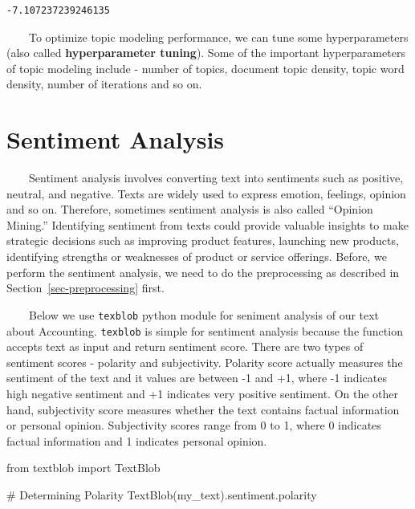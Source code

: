 \documentclass[
  letterpaper,
  DIV=11,
  numbers=noendperiod]{scrreprt}
\newenvironment{Shaded}{\begin{snugshade}}{\end{snugshade}}
\newcommand{\CommentTok}[1]{\textcolor[rgb]{0.37,0.37,0.37}{#1}}
\newcommand{\ImportTok}[1]{\textcolor[rgb]{0.00,0.46,0.62}{#1}}
\newcommand{\NormalTok}[1]{\textcolor[rgb]{0.00,0.23,0.31}{#1}}
\begin{document}
\begin{verbatim}
-7.107237239246135
\end{verbatim}

~~~~To optimize topic modeling performance, we can tune some
hyperparameters (also called \textbf{hyperparameter tuning}). Some of
the important hyperparameters of topic modeling include - number of
topics, document topic density, topic word density, number of iterations
and so on.

\section{Sentiment Analysis}\label{sentiment-analysis}

~~~~Sentiment analysis involves converting text into sentiments such as
positive, neutral, and negative. Texts are widely used to express
emotion, feelings, opinion and so on. Therefore, sometimes sentiment
analysis is also called ``Opinion Mining.'' Identifying sentiment from
texts could provide valuable insights to make strategic decisions such
as improving product features, launching new products, identifying
strengths or weaknesses of product or service offerings. Before, we
perform the sentiment analysis, we need to do the preprocessing as
described in Section~\ref{sec-preprocessing} first.

~~~~Below we use \texttt{texblob} python module for seniment analysis of
our text about Accounting. \texttt{texblob} is simple for sentiment
analysis because the function accepts text as input and return sentiment
score. There are two types of sentiment scores - polarity and
subjectivity. Polarity score actually measures the sentiment of the text
and it values are between -1 and +1, where -1 indicates high negative
sentiment and +1 indicates very positive sentiment. On the other hand,
subjectivity score measures whether the text contains factual
information or personal opinion. Subjectivity scores range from 0 to 1,
where 0 indicates factual information and 1 indicates personal opinion.

\begin{Shaded}
\begin{Highlighting}[]
\ImportTok{from}\NormalTok{ textblob }\ImportTok{import}\NormalTok{ TextBlob}
\end{Highlighting}
\end{Shaded}

\begin{Shaded}
\begin{Highlighting}[]
\CommentTok{\# Determining Polarity }
\NormalTok{TextBlob(my\_text).sentiment.polarity}
\end{Highlighting}
\end{Shaded}
\end{document}
